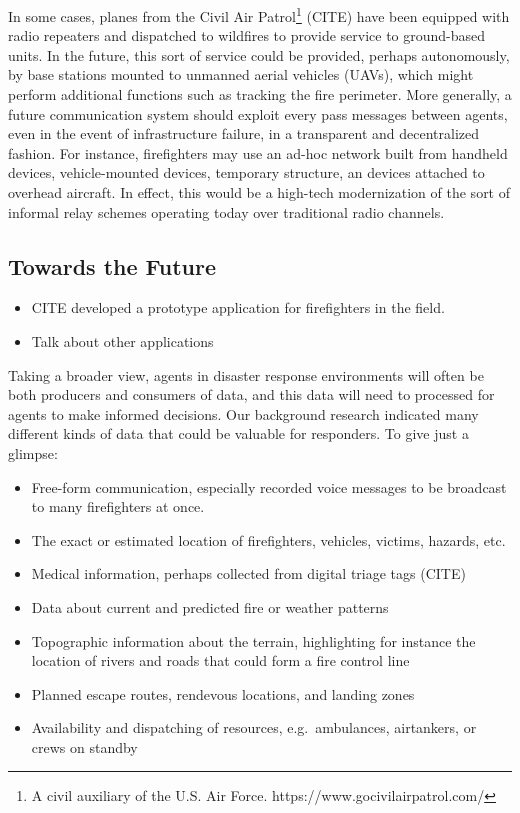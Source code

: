 \documentclass[]             %
{NASA}                       %
\theoremstyle{definition}
\providecommand{\tightlist}{%
  \setlength{\itemsep}{0pt}\setlength{\parskip}{0pt}}
\begin{document}
In some cases, planes from the Civil Air Patrol\footnote{A civil
  auxiliary of the U.S. Air Force. https://www.gocivilairpatrol.com/}
(CITE) have been equipped with radio repeaters and dispatched to
wildfires to provide service to ground-based units. In the future, this
sort of service could be provided, perhaps autonomously, by base
stations mounted to unmanned aerial vehicles (UAVs), which might perform
additional functions such as tracking the fire perimeter. More
generally, a future communication system should exploit every pass
messages between agents, even in the event of infrastructure failure, in
a transparent and decentralized fashion. For instance, firefighters may
use an ad-hoc network built from handheld devices, vehicle-mounted
devices, temporary structure, an devices attached to overhead aircraft.
In effect, this would be a high-tech modernization of the sort of
informal relay schemes operating today over traditional radio channels.

\subsection{Towards the Future}\label{towards-the-future}

\begin{itemize}
\tightlist
\item
  CITE developed a prototype application for firefighters in the field.
\item
  Talk about other applications
\end{itemize}

Taking a broader view, agents in disaster response environments will
often be both producers and consumers of data, and this data will need
to processed for agents to make informed decisions. Our background
research indicated many different kinds of data that could be valuable
for responders. To give just a glimpse:

\begin{itemize}
\tightlist
\item
  Free-form communication, especially recorded voice messages to be
  broadcast to many firefighters at once.
\item
  The exact or estimated location of firefighters, vehicles, victims,
  hazards, etc.
\item
  Medical information, perhaps collected from digital triage tags (CITE)
\item
  Data about current and predicted fire or weather patterns
\item
  Topographic information about the terrain, highlighting for instance
  the location of rivers and roads that could form a fire control line
\item
  Planned escape routes, rendevous locations, and landing zones
\item
  Availability and dispatching of resources, e.g.~ambulances,
  airtankers, or crews on standby
\end{itemize}
\end{document}
